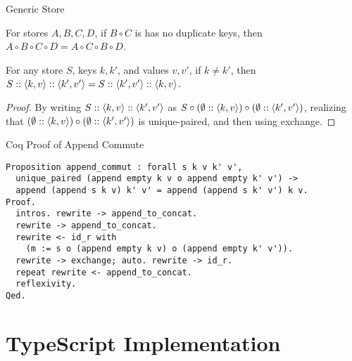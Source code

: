 \begin{frame}[allowframebreaks]{Generic Store}
    \begin{theorem}[Exchange]
    For stores $A, B, C, D$, if $B \circ C$ is has no duplicate keys, then $A \circ B \circ C \circ D = A \circ C \circ B \circ D$.
    \end{theorem}
    
    \begin{corollary}
    For any store $S$, keys $k, k'$, and values $v, v'$, if $k \not= k'$, then $S :: \left\langle k, v \right\rangle :: \left\langle k', v' \right\rangle = S :: \left\langle k', v' \right\rangle :: \left\langle k, v \right\rangle$.
    \end{corollary}
    \begin{proof}
    By writing $S :: \left\langle k, v \right\rangle :: \left\langle k', v' \right\rangle$ as $S \circ (\emptyset :: \left\langle k, v \right\rangle) \circ (\emptyset :: \left\langle k', v' \right\rangle)$, realizing that $(\emptyset :: \left\langle k, v \right\rangle) \circ (\emptyset :: \left\langle k', v' \right\rangle)$ is unique-paired, and then using exchange.
    \end{proof}
\end{frame}

\begin{frame}[fragile]{Coq Proof of Append Commute}
    \begin{verbatim}
Proposition append_commut : forall s k v k' v',
  unique_paired (append empty k v o append empty k' v') ->
  append (append s k v) k' v' = append (append s k' v') k v.
Proof.
  intros. rewrite -> append_to_concat.
  rewrite -> append_to_concat.
  rewrite <- id_r with
    (m := s o (append empty k v) o (append empty k' v')).
  rewrite -> exchange; auto. rewrite -> id_r.
  repeat rewrite <- append_to_concat.
  reflexivity.
Qed.
    \end{verbatim}
\end{frame}

\section{TypeScript Implementation}

